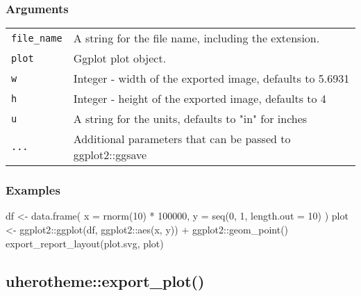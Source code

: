 \documentclass[
  letterpaper,
  DIV=11,
  numbers=noendperiod]{scrreport}
\newenvironment{Shaded}{\begin{snugshade}}{\end{snugshade}}
\newcommand{\AttributeTok}[1]{\textcolor[rgb]{0.40,0.45,0.13}{#1}}
\newcommand{\DecValTok}[1]{\textcolor[rgb]{0.68,0.00,0.00}{#1}}
\newcommand{\FunctionTok}[1]{\textcolor[rgb]{0.28,0.35,0.67}{#1}}
\newcommand{\NormalTok}[1]{\textcolor[rgb]{0.00,0.23,0.31}{#1}}
\newcommand{\OtherTok}[1]{\textcolor[rgb]{0.00,0.23,0.31}{#1}}
\newcommand{\SpecialCharTok}[1]{\textcolor[rgb]{0.37,0.37,0.37}{#1}}
\newcommand{\StringTok}[1]{\textcolor[rgb]{0.13,0.47,0.30}{#1}}
\begin{document}
\subsubsection{Arguments}\label{arguments-80}

\begin{longtable}[]{@{}ll@{}}
\toprule\noalign{}
\endhead
\bottomrule\noalign{}
\endlastfoot
\texttt{file\_name} & A string for the file name, including the
extension. \\
\texttt{plot} & Ggplot plot object. \\
\texttt{w} & Integer - width of the exported image, defaults to
5.6931 \\
\texttt{h} & Integer - height of the exported image, defaults to 4 \\
\texttt{u} & A string for the units, defaults to "in" for inches \\
\texttt{...} & Additional parameters that can be passed to
ggplot2::ggsave \\
\end{longtable}

\subsubsection{Examples}\label{examples-79}

\begin{Shaded}
\begin{Highlighting}[]
\NormalTok{df }\OtherTok{\textless{}{-}} \FunctionTok{data.frame}\NormalTok{(}
  \AttributeTok{x =} \FunctionTok{rnorm}\NormalTok{(}\DecValTok{10}\NormalTok{) }\SpecialCharTok{*} \DecValTok{100000}\NormalTok{,}
  \AttributeTok{y =} \FunctionTok{seq}\NormalTok{(}\DecValTok{0}\NormalTok{, }\DecValTok{1}\NormalTok{, }\AttributeTok{length.out =} \DecValTok{10}\NormalTok{)}
\NormalTok{)}
\NormalTok{plot }\OtherTok{\textless{}{-}}\NormalTok{ ggplot2}\SpecialCharTok{::}\FunctionTok{ggplot}\NormalTok{(df, ggplot2}\SpecialCharTok{::}\FunctionTok{aes}\NormalTok{(x, y)) }\SpecialCharTok{+}\NormalTok{ ggplot2}\SpecialCharTok{::}\FunctionTok{geom\_point}\NormalTok{()}
\FunctionTok{export\_report\_layout}\NormalTok{(}\StringTok{\textquotesingle{}plot.svg\textquotesingle{}}\NormalTok{, plot)}
\end{Highlighting}
\end{Shaded}

\subsection{uherotheme::export\_plot()}\label{uherothemeexport_plot}
\end{document}
